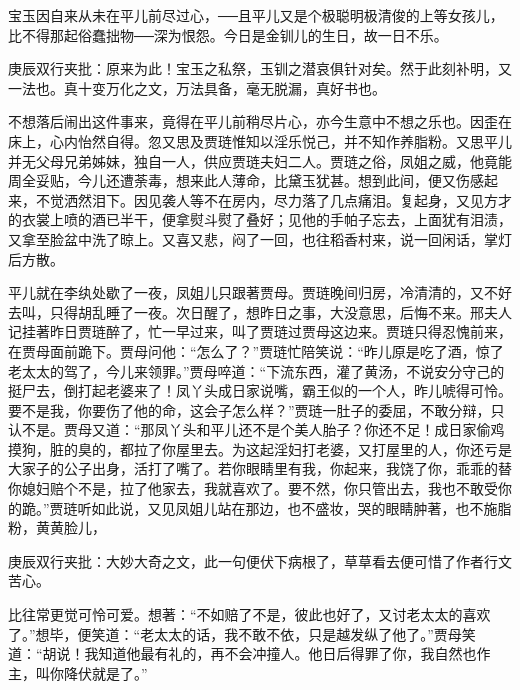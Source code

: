 \begin{parag}
    宝玉因自来从未在平儿前尽过心，──且平儿又是个极聪明极清俊的上等女孩儿，比不得那起俗蠢拙物──深为恨怨。今日是金钏儿的生日，故一日不乐。\begin{note}庚辰双行夹批：原来为此！宝玉之私祭，玉钏之潜哀俱针对矣。然于此刻补明，又一法也。真十变万化之文，万法具备，毫无脱漏，真好书也。\end{note}不想落后闹出这件事来，竟得在平儿前稍尽片心，亦今生意中不想之乐也。因歪在床上，心内怡然自得。忽又思及贾琏惟知以淫乐悦己，并不知作养脂粉。又思平儿并无父母兄弟姊妹，独自一人，供应贾琏夫妇二人。贾琏之俗，凤姐之威，他竟能周全妥贴，今儿还遭荼毒，想来此人薄命，比黛玉犹甚。想到此间，便又伤感起来，不觉洒然泪下。因见袭人等不在房内，尽力落了几点痛泪。复起身，又见方才的衣裳上喷的酒已半干，便拿熨斗熨了叠好；见他的手帕子忘去，上面犹有泪渍，又拿至脸盆中洗了晾上。又喜又悲，闷了一回，也往稻香村来，说一回闲话，掌灯后方散。
\end{parag}


\begin{parag}
    平儿就在李纨处歇了一夜，凤姐儿只跟著贾母。贾琏晚间归房，冷清清的，又不好去叫，只得胡乱睡了一夜。次日醒了，想昨日之事，大没意思，后悔不来。邢夫人记挂著昨日贾琏醉了，忙一早过来，叫了贾琏过贾母这边来。贾琏只得忍愧前来，在贾母面前跪下。贾母问他：“怎么了？”贾琏忙陪笑说：“昨儿原是吃了酒，惊了老太太的驾了，今儿来领罪。”贾母啐道：“下流东西，灌了黄汤，不说安分守己的挺尸去，倒打起老婆来了！凤丫头成日家说嘴，霸王似的一个人，昨儿唬得可怜。要不是我，你要伤了他的命，这会子怎么样？”贾琏一肚子的委屈，不敢分辩，只认不是。贾母又道：“那凤丫头和平儿还不是个美人胎子？你还不足！成日家偷鸡摸狗，脏的臭的，都拉了你屋里去。为这起淫妇打老婆，又打屋里的人，你还亏是大家子的公子出身，活打了嘴了。若你眼睛里有我，你起来，我饶了你，乖乖的替你媳妇赔个不是，拉了他家去，我就喜欢了。要不然，你只管出去，我也不敢受你的跪。”贾琏听如此说，又见凤姐儿站在那边，也不盛妆，哭的眼睛肿著，也不施脂粉，黄黄脸儿，\begin{note}庚辰双行夹批：大妙大奇之文，此一句便伏下病根了，草草看去便可惜了作者行文苦心。\end{note}比往常更觉可怜可爱。想著：“不如赔了不是，彼此也好了，又讨老太太的喜欢了。”想毕，便笑道：“老太太的话，我不敢不依，只是越发纵了他了。”贾母笑道：“胡说！我知道他最有礼的，再不会冲撞人。他日后得罪了你，我自然也作主，叫你降伏就是了。”
\end{parag}


